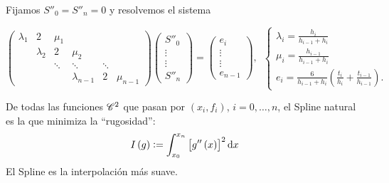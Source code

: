 \begin{obs}
    Fijamos $S''_0=S''_n=0$ y resolvemos el sistema

    \[
        \begin{pmatrix}
            \lambda_1   & 2 & \mu_1 & \\
            & \lambda_2 & 2 & \mu_2 & & \\
            & & \ddots    & \ddots & \ddots & \\
            & & & \lambda_{n-1} & 2 & \mu_{n-1} 
        \end{pmatrix}
        \begin{pmatrix}
            S''_0 \\
            \vdots \\
            \vdots \\
            S''_n
        \end{pmatrix}
        =
        \begin{pmatrix}
            e_i \\
            \vdots \\
            \vdots \\
            e_{n-1}
        \end{pmatrix}
        ,\,\,\,
        \begin{cases}
            \lambda_i = \frac{h_i}{h_{i-1} + h_i} \\
            \mu_i = \frac{h_{i-1}}{h_{i-1}+h_i} \\
            e_i = \frac{6}{h_{i-1} + h_i}\left( \frac{t_i}{h_{i}} + \frac{t_{i-1}}{h_{i-1}} \right).
        \end{cases}
    \]
\end{obs}

\begin{teo}
    De todas las funciones $\mathscr{C}^2$ que pasan por $\left( x_i, f_i \right)$, $i=0,\dots,n$, el Spline natural es la que minimiza la ``rugosidad'':
    \[
        I\left( g \right) := \int_{x_0}^{x_n} \left[ g''\left( x \right) \right]^2 \dif x
    \]
    El Spline es la interpolación más suave.
\end{teo}


